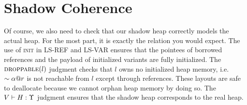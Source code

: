 \section*{Shadow Coherence}
Of course, we also need to check that our shadow heap correctly models
the actual heap. For the most part, it is exactly the relation you would expect.
The use of \textsc{init} in \textsc{LS-REF} and \textsc{LS-VAR} ensures that
the pointees of borrowed references and the payload of initialized variants
are fully initialized.
The $\textsc{droppable}(l)$ judgment checks that $l$ owns no initialized heap memory,
i.e. $\sim{{\alpha}@{r}}$ is not reachable from $l$ except through references.
These layouts are safe to deallocate because we cannot orphan heap memory by doing so.
The ${V} \vdash {H} : {\Upsilon}$ judgment ensures that the shadow heap corresponds to the real heap.
\newline





